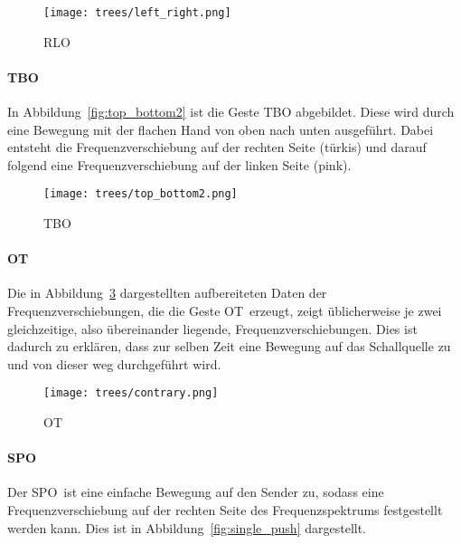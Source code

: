 \begin{figure}[htbp] \centering
\texttt{[image: trees/left\_right.png]}
\caption{\acl{RLO}}
\label{fig:left_right}
\end{figure}


\paragraph*{\acl{TBO}}
In Abbildung~\ref{fig:top_bottom2} ist die Geste \acl{TBO} abgebildet. Diese wird durch eine Bewegung mit der flachen Hand von oben nach unten ausgeführt. Dabei entsteht die Frequenzverschiebung auf der rechten Seite (türkis) und darauf folgend eine Frequenzverschiebung auf der linken Seite (pink). 


\begin{figure}[htbp] \centering
\texttt{[image: trees/top\_bottom2.png]}
\caption{\acl{TBO}}
\label{fig:top_bottom}
\end{figure}

\paragraph*{\acl{OT}}
Die in Abbildung~\ref{fig:contrary} dargestellten aufbereiteten Daten der Frequenzverschiebungen, die die Geste \glqq \acl{OT}\grqq\ erzeugt, zeigt üblicherweise je zwei gleichzeitige, also übereinander liegende, Frequenzverschiebungen. Dies ist dadurch zu erklären, dass zur selben Zeit eine Bewegung auf das Schallquelle zu und von dieser weg durchgeführt wird.

\begin{figure}[htbp] \centering
\texttt{[image: trees/contrary.png]}
\caption{\acl{OT}}
\label{fig:contrary}
\end{figure}


\paragraph*{\acl{SPO}}
Der \glqq \acl{SPO}\grqq\ ist eine einfache Bewegung auf den Sender zu, sodass eine Frequenzverschiebung auf der rechten Seite des Frequenzspektrums festgestellt werden kann. Dies ist in Abbildung~\ref{fig:single_push} dargestellt.

